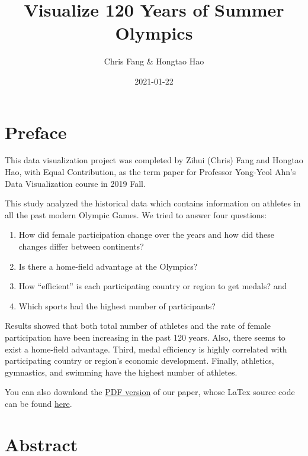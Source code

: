 \documentclass[
]{article}
\title{Visualize 120 Years of Summer Olympics}
\author{Chris Fang \& Hongtao Hao}
\date{2021-01-22}
\begin{document}
\maketitle

{
\setcounter{tocdepth}{2}
\tableofcontents
}
\hypertarget{preface}{%
\section*{Preface}\label{preface}}

This data visualization project was completed by Zihui (Chris) Fang and Hongtao Hao, with Equal Contribution, as the term paper for Professor Yong-Yeol Ahn's Data Visualization course in 2019 Fall.

This study analyzed the historical data which contains information on athletes in all the past modern Olympic Games. We tried to answer four questions:

\begin{enumerate}
\def\labelenumi{\arabic{enumi}.}
\item
  How did female participation change over the years and how did these changes differ between continents?
\item
  Is there a home-field advantage at the Olympics?
\item
  How ``efficient'' is each participating country or region to get medals? and
\item
  Which sports had the highest number of participants?
\end{enumerate}

Results showed that both total number of athletes and the rate of female participation have been increasing in the past 120 years. Also, there seems to exist a home-field advantage. Third, medal efficiency is highly correlated with participating country or region's economic development. Finally, athletics, gymnastics, and swimming have the highest number of athletes.

You can also download the \href{https://raw.githubusercontent.com/hongtaoh/olymvis/master/static/tex-pdf/fang_hao_olymvis.pdf}{PDF version} of our paper, whose LaTex source code can be found \href{https://github.com/hongtaoh/olymvis/blob/master/static/tex-pdf/fang_hao_olymvis.tex}{here}.

\hypertarget{abstract}{%
\section*{Abstract}\label{abstract}}
\end{document}
